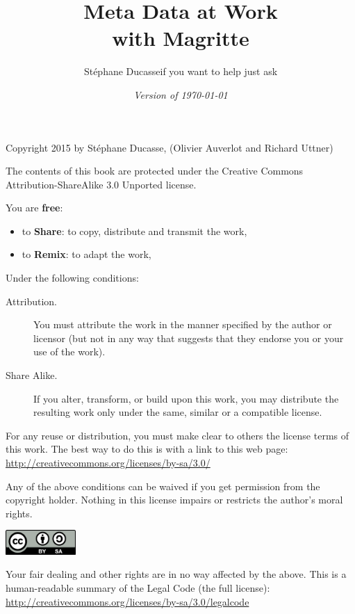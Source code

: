 \documentclass[a4paper,10pt,twoside]{book}
\begin{document}
\frontmatter
\setcounter{page}{1}
\pagestyle{headings}
\author{
	St\'ephane Ducasse\quad if you want to help just ask
	}
\title{\Huge\bf Meta Data at Work \\ with Magritte}
\isodate
\date{\emph{Version of \today}}

\date{}
\maketitle


{\small

  Copyright 2015 by St\'ephane Ducasse, (Olivier Auverlot and Richard Uttner)

  The contents of this book are protected under the Creative Commons
  Attribution-ShareAlike 3.0 Unported license.

  You are \textbf{free}:
  \begin{itemize}
  \item to \textbf{Share}: to copy, distribute and transmit the work,
  \item to \textbf{Remix}: to adapt the work,
  \end{itemize}

  Under the following conditions:
  \begin{description}
  \item[Attribution.] You must attribute the work in the manner specified by the
    author or licensor (but not in any way that suggests that they endorse you
    or your use of the work).
  \item[Share Alike.] If you alter, transform, or build upon this work, you may
    distribute the resulting work only under the same, similar or a compatible
    license.
  \end{description}

  For any reuse or distribution, you must make clear to others the
  license terms of this work. The best way to do this is with a link to
  this web page: \\
  \url{http://creativecommons.org/licenses/by-sa/3.0/}

  Any of the above conditions can be waived if you get permission from
  the copyright holder. Nothing in this license impairs or restricts the
  author's moral rights.

  \begin{center}
    \includegraphics[width=0.2\textwidth]{support/latex/CreativeCommons-BY-SA.pdf}
  \end{center}

  Your fair dealing and other rights are in no way affected by the
  above. This is a human-readable summary of the Legal Code (the full
  license): \\
  \url{http://creativecommons.org/licenses/by-sa/3.0/legalcode}

  \vfill

}
\end{document}
